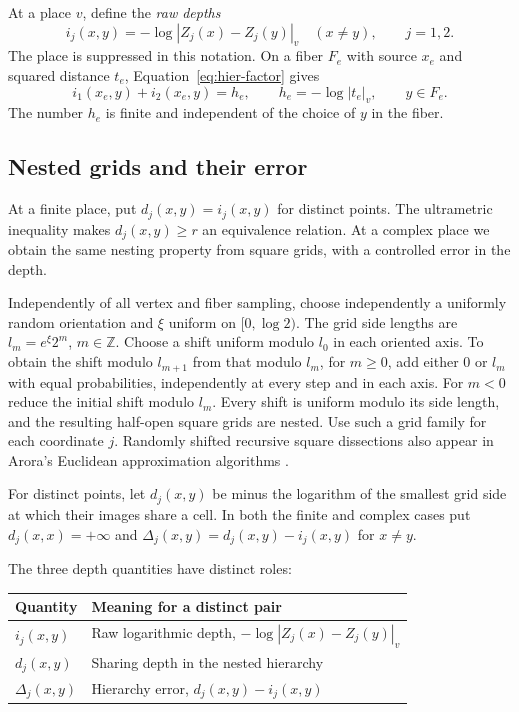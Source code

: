 At a place $v$, define the \emph{raw depths}
\[
 i_j(x,y)=-\log|Z_j(x)-Z_j(y)|_v\quad(x\ne y),\qquad j=1,2.
\]
The place is suppressed in this notation.  On a fiber $F_e$ with source
$x_e$ and squared distance $t_e$, Equation~\eqref{eq:hier-factor} gives
\begin{equation}\label{eq:hier-fiber}
 i_1(x_e,y)+i_2(x_e,y)=h_e,
 \qquad h_e=-\log|t_e|_v,\qquad y\in F_e.
\end{equation}
The number $h_e$ is finite and independent of the choice of $y$ in the
fiber.

\subsection{Nested grids and their error}

At a finite place, put $d_j(x,y)=i_j(x,y)$ for distinct points.  The
ultrametric inequality makes $d_j(x,y)\ge r$ an equivalence relation.
At a complex place we obtain the same nesting property from square
grids, with a controlled error in the depth.

Independently of all vertex and fiber sampling, choose independently a
uniformly random orientation and $\xi$ uniform on $[0,\log2)$.  The grid
side lengths are $l_m=e^\xi2^m$, $m\in\mathbb Z$.  Choose a shift uniform
modulo $l_0$ in each oriented axis.  To obtain the shift modulo
$l_{m+1}$ from that modulo $l_m$, for $m\ge0$, add either $0$ or $l_m$
with equal probabilities, independently at every step and in each
axis.  For $m<0$ reduce the initial shift modulo $l_m$.  Every shift is
uniform modulo its side length, and the resulting half-open square
grids are nested.  Use such a grid family for each coordinate $j$.
Randomly shifted recursive square dissections also appear in Arora's
Euclidean approximation algorithms \cite[Section~2.1]{Arora1998}.

For distinct points, let $d_j(x,y)$ be minus the logarithm of the
smallest grid side at which their images share a cell.  In both the
finite and complex cases put $d_j(x,x)=+\infty$ and
$\Delta_j(x,y)=d_j(x,y)-i_j(x,y)$ for $x\ne y$.

The three depth quantities have distinct roles:
\begin{center}
\begin{tabular}{@{}ll@{}}
\toprule
Quantity & Meaning for a distinct pair \\
\midrule
$i_j(x,y)$ & Raw logarithmic depth, $-\log|Z_j(x)-Z_j(y)|_v$ \\
$d_j(x,y)$ & Sharing depth in the nested hierarchy \\
$\Delta_j(x,y)$ & Hierarchy error, $d_j(x,y)-i_j(x,y)$ \\
\bottomrule
\end{tabular}
\end{center}

